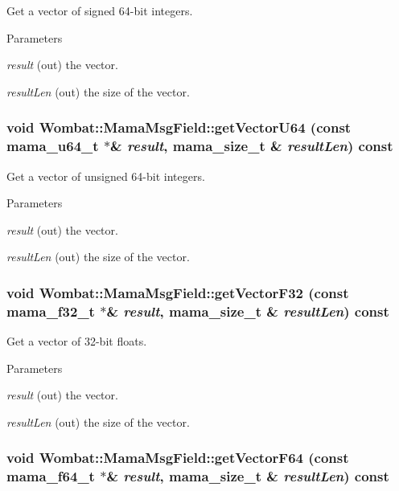 Get a vector of signed 64-\/bit integers. 
\begin{DoxyParams}{Parameters}
\item[{\em result}](out) the vector. \item[{\em resultLen}](out) the size of the vector. \end{DoxyParams}
\hypertarget{classWombat_1_1MamaMsgField_a9f3ad41fef1e9dcf8369f86a9d2be18d}{
\subsubsection[{getVectorU64}]{\setlength{\rightskip}{0pt plus 5cm}void Wombat::MamaMsgField::getVectorU64 (const mama\_\-u64\_\-t $\ast$\& {\em result}, \/  {\bf mama\_\-size\_\-t} \& {\em resultLen}) const}}
\label{classWombat_1_1MamaMsgField_a9f3ad41fef1e9dcf8369f86a9d2be18d}


Get a vector of unsigned 64-\/bit integers. 
\begin{DoxyParams}{Parameters}
\item[{\em result}](out) the vector. \item[{\em resultLen}](out) the size of the vector. \end{DoxyParams}
\hypertarget{classWombat_1_1MamaMsgField_ae3721635ea8bfa48ba174a2ebc81c00d}{
\subsubsection[{getVectorF32}]{\setlength{\rightskip}{0pt plus 5cm}void Wombat::MamaMsgField::getVectorF32 (const mama\_\-f32\_\-t $\ast$\& {\em result}, \/  {\bf mama\_\-size\_\-t} \& {\em resultLen}) const}}
\label{classWombat_1_1MamaMsgField_ae3721635ea8bfa48ba174a2ebc81c00d}


Get a vector of 32-\/bit floats. 
\begin{DoxyParams}{Parameters}
\item[{\em result}](out) the vector. \item[{\em resultLen}](out) the size of the vector. \end{DoxyParams}
\hypertarget{classWombat_1_1MamaMsgField_a372c74814b6bf9ea043d27218ddcdd1d}{
\subsubsection[{getVectorF64}]{\setlength{\rightskip}{0pt plus 5cm}void Wombat::MamaMsgField::getVectorF64 (const mama\_\-f64\_\-t $\ast$\& {\em result}, \/  {\bf mama\_\-size\_\-t} \& {\em resultLen}) const}}
\label{classWombat_1_1MamaMsgField_a372c74814b6bf9ea043d27218ddcdd1d}


